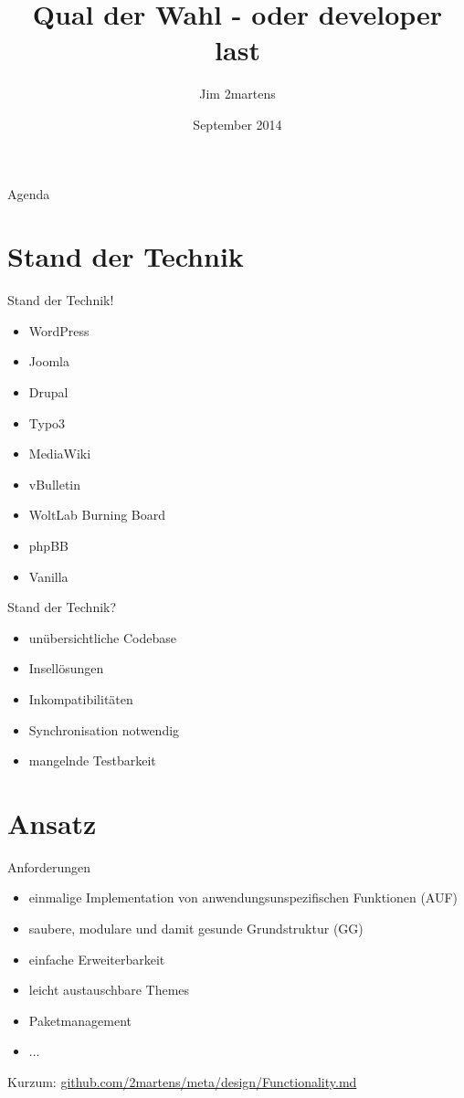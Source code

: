 \documentclass{beamer}
\begin{document}
\author{Jim 2martens}
\title{Qual der Wahl - oder developer last}
\date{September 2014}

	\begin{frame}
		\titlepage
	\end{frame}
	
	\begin{frame}{Agenda}
		\tableofcontents
	\end{frame}
	
	\section{Stand der Technik}
	\begin{frame}{Stand der Technik!}
		\only<1-4> {		
		\begin{itemize}
			\item<1-4> WordPress
			\item<2-4> Joomla
			\item<3-4> Drupal
			\item<4> Typo3
		\end{itemize}
		}
		\only<5-> {
		\begin{itemize}
			\item<5-> MediaWiki
			\item<6-> vBulletin
			\item<7-> WoltLab Burning Board
			\item<8-> phpBB
			\item<9-> Vanilla
		\end{itemize}
		}
	\end{frame}
	\begin{frame}{Stand der Technik?}
		\begin{itemize}
			\item<+-> unübersichtliche Codebase
			\item<+-> Insellösungen
			\item<+-> Inkompatibilitäten
			\item<+-> Synchronisation notwendig
			\item<+-> mangelnde Testbarkeit
		\end{itemize}
	\end{frame}

	\section{Ansatz}	
	\begin{frame}{Anforderungen}
		\begin{itemize}
			\item einmalige Implementation von anwendungsunspezifischen Funktionen (AUF)
			\item saubere, modulare und damit gesunde Grundstruktur (GG)
			\item einfache Erweiterbarkeit
			\item leicht austauschbare Themes
			\item Paketmanagement
			\item ...
		\end{itemize}
		Kurzum: \href{https://github.com/2martens/meta/blob/master/design/Functionality.md}{github.com/2martens/meta/design/Functionality.md}
	\end{frame}
	
\end{document}
